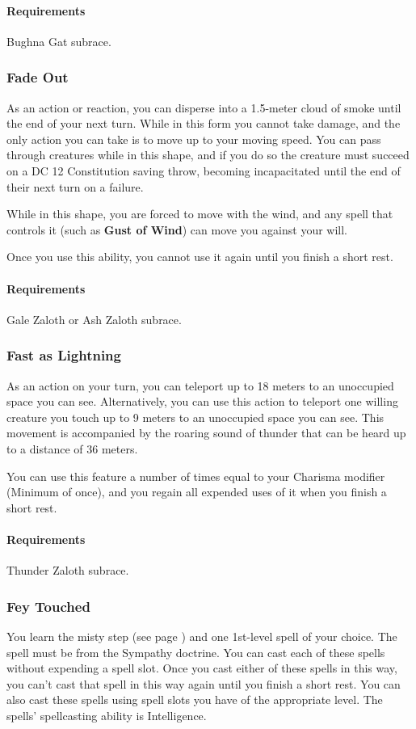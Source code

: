     \paragraph{Requirements} Bughna Gat subrace.
\subsubsection{Fade Out} \label{feat::fadeout}
    As an action or reaction, you can disperse into a 1.5-meter cloud of smoke until the end of your next turn.
    While in this form you cannot take damage, and the only action you can take is to move up to your moving speed.
    You can pass through creatures while in this shape, and if you do so the creature must succeed on a DC 12 Constitution saving throw, becoming incapacitated until the end of their next turn on a failure.

    While in this shape, you are forced to move with the wind, and any spell that controls it (such as \textbf{Gust of Wind}) can move you against your will.

    Once you use this ability, you cannot use it again until you finish a short rest.
    \paragraph{Requirements} Gale Zaloth or Ash Zaloth subrace.
\subsubsection{Fast as Lightning} \label{feat::fastaslightning}
    As an action on your turn, you can teleport up to 18 meters to an unoccupied space you can see.
    Alternatively, you can use this action to teleport one willing creature you touch up to 9 meters to an unoccupied space you can see.
    This movement is accompanied by the roaring sound of thunder that can be heard up to a distance of 36 meters.

    You can use this feature a number of times equal to your Charisma modifier (Minimum of once), and you regain all expended uses of it when you finish a short rest.
    \paragraph{Requirements} Thunder Zaloth subrace.
\subsubsection{Fey Touched} \label{feat::feytouched}
    You learn the misty step (see page \pageref{spell::mistystep}) and one 1st-level spell of your choice.
    The spell must be from the Sympathy doctrine.
    You can cast each of these spells without expending a spell slot.
    Once you cast either of these spells in this way, you can't cast that spell in this way again until you finish a short rest.
    You can also cast these spells using spell slots you have of the appropriate level.
    The spells' spellcasting ability is Intelligence.
